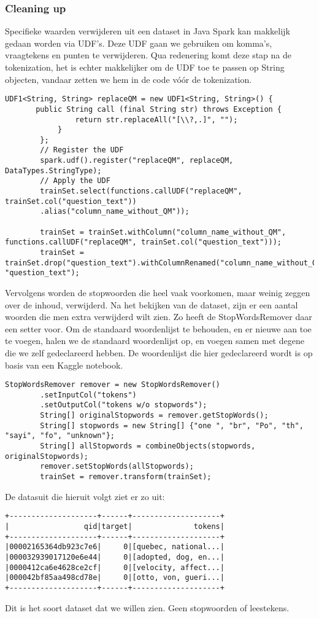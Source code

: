 \subsubsection{Cleaning up}
Specifieke waarden verwijderen uit een dataset in Java Spark kan makkelijk gedaan worden via UDF's. Deze UDF gaan we gebruiken om komma's, vraagtekens en punten te verwijderen. Qua redenering komt deze stap na de tokenization, het is echter makkelijker om de UDF toe te passen op String objecten, vandaar zetten we hem in de code vóór de tokenization.
\begin{lstlisting}[style=codeStyle]
    UDF1<String, String> replaceQM = new UDF1<String, String>() {
       public String call (final String str) throws Exception {
                return str.replaceAll("[\\?,.]", "");
            }
        };
        // Register the UDF
        spark.udf().register("replaceQM", replaceQM, DataTypes.StringType);
        // Apply the UDF
        trainSet.select(functions.callUDF("replaceQM", trainSet.col("question_text"))
        .alias("column_name_without_QM"));
        
        trainSet = trainSet.withColumn("column_name_without_QM", functions.callUDF("replaceQM", trainSet.col("question_text")));
        trainSet = trainSet.drop("question_text").withColumnRenamed("column_name_without_QM", "question_text");
\end{lstlisting}
Vervolgens worden de stopwoorden die heel vaak voorkomen, maar weinig zeggen over de inhoud, verwijderd.
Na het bekijken van de dataset, zijn er een aantal woorden die men extra verwijderd wilt zien. 
Zo heeft de StopWordsRemover daar een setter voor. Om de standaard woordenlijst te behouden, en er nieuwe aan toe te voegen, halen we de standaard woordenlijst op, en voegen samen met degene die we zelf gedeclareerd hebben. De woordenlijst die hier gedeclareerd wordt is op basis van een Kaggle notebook.
\begin{lstlisting}[style=codeStyle]
    StopWordsRemover remover = new StopWordsRemover()
        .setInputCol("tokens")
        .setOutputCol("tokens w/o stopwords");	
        String[] originalStopwords = remover.getStopWords();
        String[] stopwords = new String[] {"one ", "br", "Po", "th", "sayi", "fo", "unknown"};
        String[] allStopwords = combineObjects(stopwords, originalStopwords);
        remover.setStopWords(allStopwords);
        trainSet = remover.transform(trainSet);	
\end{lstlisting} 
De datasuit die hieruit volgt ziet er zo uit:
\begin{lstlisting}[style=commentStyle]
+--------------------+------+--------------------+
|                 qid|target|              tokens|
+--------------------+------+--------------------+
|00002165364db923c7e6|     0|[quebec, national...|
|000032939017120e6e44|     0|[adopted, dog, en...|
|0000412ca6e4628ce2cf|     0|[velocity, affect...|
|000042bf85aa498cd78e|     0|[otto, von, gueri...|
+--------------------+------+--------------------+
\end{lstlisting}
Dit is het soort dataset dat we willen zien. Geen stopwoorden of leestekens.

